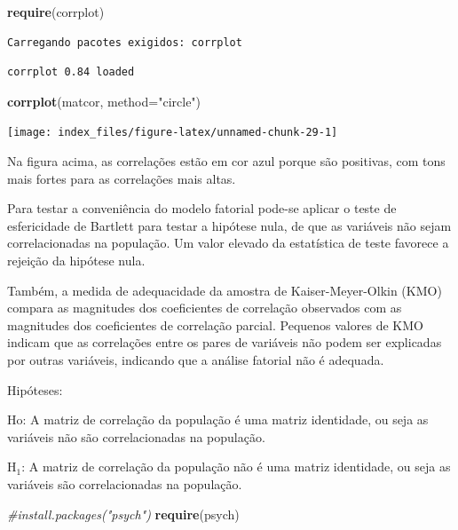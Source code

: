 \documentclass[12pt,brazil,oneside]{book}
\newenvironment{Shaded}{\begin{snugshade}}{\end{snugshade}}
\newcommand{\CommentTok}[1]{\textcolor[rgb]{0.56,0.35,0.01}{\textit{#1}}}
\newcommand{\DataTypeTok}[1]{\textcolor[rgb]{0.13,0.29,0.53}{#1}}
\newcommand{\KeywordTok}[1]{\textcolor[rgb]{0.13,0.29,0.53}{\textbf{#1}}}
\newcommand{\NormalTok}[1]{#1}
\newcommand{\StringTok}[1]{\textcolor[rgb]{0.31,0.60,0.02}{#1}}
\begin{document}
\begin{Shaded}
\begin{Highlighting}[]
\KeywordTok{require}\NormalTok{(corrplot)}
\end{Highlighting}
\end{Shaded}

\begin{verbatim}
Carregando pacotes exigidos: corrplot
\end{verbatim}

\begin{verbatim}
corrplot 0.84 loaded
\end{verbatim}

\begin{Shaded}
\begin{Highlighting}[]
\KeywordTok{corrplot}\NormalTok{(matcor, }\DataTypeTok{method=}\StringTok{"circle"}\NormalTok{)}
\end{Highlighting}
\end{Shaded}

\begin{center}\texttt{[image: index\_files/figure-latex/unnamed-chunk-29-1]} \end{center}

Na figura acima, as correlações estão em cor azul porque são positivas, com tons mais fortes para as correlações mais altas.

Para testar a conveniência do modelo fatorial pode-se aplicar o teste de esfericidade de Bartlett para testar a hipótese nula, de que as variáveis não sejam correlacionadas na população.
Um valor elevado da estatística de teste favorece a rejeição da hipótese nula.

Também, a medida de adequacidade da amostra de Kaiser-Meyer-Olkin (KMO) compara as magnitudes dos coeficientes de correlação observados com as magnitudes dos coeficientes de
correlação parcial. Pequenos valores de KMO indicam que as correlações entre os pares de variáveis não podem ser explicadas por outras variáveis, indicando que a análise fatorial não é adequada.

Hipóteses:

Ho: A matriz de correlação da população é uma matriz identidade, ou seja as variáveis não são correlacionadas na população.

H\(_1\): A matriz de correlação da população não é uma matriz identidade, ou seja as variáveis são correlacionadas na população.

\begin{Shaded}
\begin{Highlighting}[]
\CommentTok{#install.packages("psych")}
\KeywordTok{require}\NormalTok{(psych)}
\end{Highlighting}
\end{Shaded}
\end{document}
